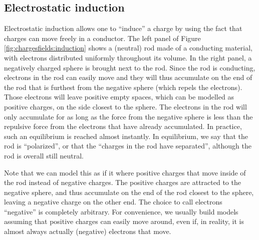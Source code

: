 
\subsection{Electrostatic induction}
Electrostatic induction allows one to ``induce'' a charge by using the fact that charges can move freely in a conductor. The left panel of Figure \ref{fig:chargesfields:induction} shows a (neutral) rod made of a conducting material, with electrons distributed uniformly throughout its volume. In the right panel, a negatively charged sphere is brought next to the rod. Since the rod is conducting, electrons in the rod can easily move and they will thus accumulate on the end of the rod that is furthest from the negative sphere (which repels the electrons). Those electrons will leave positive empty spaces, which can be modelled as positive charges, on the side closest to the sphere. The electrons in the rod will only accumulate for as long as the force from the negative sphere is less than the repulsive force from the electrons that have already accumulated. In practice, such an equilibrium is reached almost instantly. In equilibrium, we say that the rod is ``polarized'', or that the ``charges in the rod have separated'', although the rod is overall still neutral.

Note that we can model this as if it where positive charges that move inside of the rod instead of negative charges. The positive charges are attracted to the negative sphere, and thus accumulate on the end of the rod closest to the sphere, leaving a negative charge on the other end. The choice to call electrons ``negative'' is completely arbitrary. For convenience, we usually build models assuming that positive charges can easily move around, even if, in reality, it is almost always actually (negative) electrons that move.


